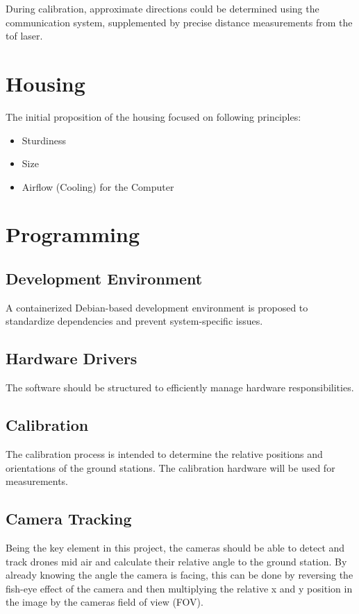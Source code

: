 During calibration, approximate directions could be determined using the communication system, supplemented by precise distance measurements from the \acrshort{tof} laser.


\section{Housing}

The initial proposition of the housing focused on following principles:
\begin{itemize}
	\item Sturdiness
	\item Size
	\item Airflow (Cooling) for the Computer
\end{itemize}


\section{Programming}

\subsection{Development Environment}

A containerized Debian-based development environment is proposed to standardize dependencies and prevent system-specific issues.

\subsection{Hardware Drivers}

The software should be structured to efficiently manage hardware responsibilities.

\subsection{Calibration}

The calibration process is intended to determine the relative positions and orientations of the ground stations. The calibration hardware will be used for measurements.

\subsection{Camera Tracking}
Being the key element in this project, the cameras should be able to detect and track drones mid air and calculate their relative angle to the ground station. By already knowing the angle the camera is facing, this can be done by reversing the fish-eye effect of the camera and then multiplying the relative x and y position in the image by the cameras field of view (FOV).


